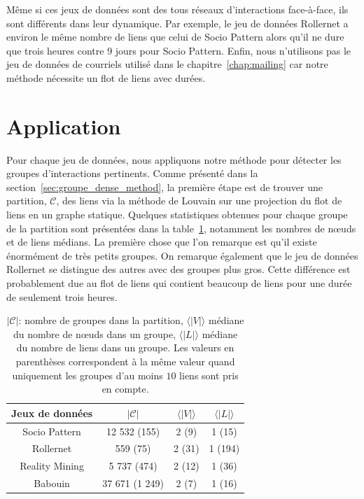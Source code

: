 Même si ces jeux de données sont des tous réseaux d'interactions face-à-face, ils sont différents dans leur dynamique.
Par exemple, le jeu de données Rollernet a environ le même nombre de liens que celui de Socio Pattern alors qu'il ne dure que trois heures contre 9 jours pour Socio Pattern.
Enfin, nous n'utilisons pas le jeu de données de courriels utilisé dans le chapitre~\ref{chap:mailing} car notre méthode nécessite un flot de liens avec durées.



\section{Application}
\label{sec:groupe_dense_result}

Pour chaque jeu de données, nous appliquons notre méthode pour détecter les groupes d'interactions pertinents.
Comme présenté dans la section~\ref{sec:groupe_dense_method}, la première étape est de trouver une partition, $\mathcal{C}$, des liens via la méthode de Louvain sur une projection du flot de liens en un graphe statique.
Quelques statistiques obtenues pour chaque groupe de la partition sont présentées dans la table~\ref{tab:partition_spec_gd}, notamment les nombres de n\oe{}uds et de liens médians.
La première chose que l'on remarque est qu'il existe énormément de très petits groupes.
On remarque également que le jeu de données Rollernet se distingue des autres avec des groupes plus gros.
Cette différence est probablement due au flot de liens qui contient beaucoup de liens pour une durée de seulement trois heures.

\begin{table}
\centering
\begin{tabular}{|c|c|c|c|}
\hline \rule[-1ex]{0pt}{3.5ex}
Jeux de données & $|\mathcal{C}|$ & $\langle|V|\rangle$ & $\langle|L|\rangle$ \\
\hline
Socio Pattern & 12 532 (155) & 2 (9) & 1 (15)\\
Rollernet& 559 (75) & 2 (31) & 1 (194)\\
Reality Mining & 5 737 (474) & 2 (12) & 1 (36)\\
Babouin & 37 671 (1 249) & 2 (7) & 1 (16)\\
\hline
\end{tabular}
\caption{$|\mathcal{C}|$: nombre de groupes dans la partition, $\langle|V|\rangle$ médiane du nombre de n\oe{}uds dans un groupe, $\langle|L|\rangle$ médiane du nombre de liens dans un groupe.
Les valeurs en parenthèses correspondent à la même valeur quand uniquement les groupes d'au moins $10$ liens sont pris en compte.}
\label{tab:partition_spec_gd} %
\end{table}



